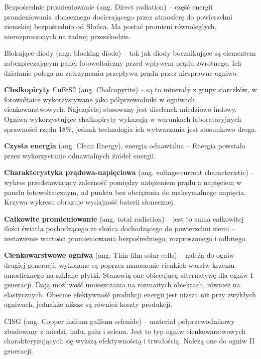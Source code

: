 \documentclass[12pt,a4paper]{article}
\begin{document}
Bezpośrednie promieniowanie (ang. Direct radiation) – część energii promieniowania słonecznego docierającego przez atmosferę do powierzchni ziemskiej bezpośrednio od Słońca. Ma postać promieni równoległych, nierozproszonych na żadnej przeszkodzie.

Blokujące diody (ang. blocking diode) – tak jak diody bocznikujące są elementem zabezpieczającym panel fotowoltaiczny przed wpływem prądu zwrotnego. Ich działanie polega na zatrzymaniu przepływu prądu przez niesprawne ogniwo.


\textbf{Chalkopiryty} CuFeS2 (ang. Chalcopyrite) – są to minerały z grupy siarczków, w fotowoltaice wykorzystywane jako półprzewodniki w ogniwach cienkowarstwowych. Najczęściej stosowany jest diselenek miedziowo indowy. Ogniwa wykorzystujące chalkopiryty wykazują w warunkach laboratoryjnych sprawności rzędu 18\%, jednak technologia ich wytwarzania jest stosunkowo droga.

\textbf{Czysta energia} (ang. Clean Energy), energia odnawialna – Energia powstała przez wykorzystanie odnawialnych źródeł energii.

\textbf{Charakterystyka prądowa-napięciowa} (ang. voltage-current characteristic) – wykres przedstawiający zależność pomiędzy natężeniem prądu a napięciem w panelu fotowoltaicznym, od punktu bez obciążenia do maksymalnego napięcia. Krzywa wykresu obrazuje wydajność baterii słonecznej.

\textbf{Całkowite promieniowanie} (ang. total radiation) – jest to suma całkowitej ilości światła pochodzącego ze słońca dochodzącego do powierzchni ziemi – zestawienie wartości promieniowania bezpośredniego, rozproszonego i odbitego.

\textbf{Cienkowarstwowe ogniwa} (ang. Thin-film solar cells) – należą do ogniw drugiej generacji, wykonane są poprzez nanoszenie cienkich warstw krzemu amorficznego na szklane płytki. Stanowią one obiecującą alternatywę dla ogniw I generacji. Dają możliwość umieszczania na rozmaitych obiektach, również na elastycznych. Obecnie efektywność produkcji energii jest niższa niż przy zwykłych ogniwach, jednakże niższe są również koszty produkcji.

CISG (ang. Copper indium gallium selenide) – materiał półprzewodnikowy zbudowany z miedzi, indu, galu i selenu. Jest to typ ogniw cienkowarstwowych charakteryzujących się wyższą efektywnością i trwałością. Należą one do ogniw II generacji.
\end{document}
